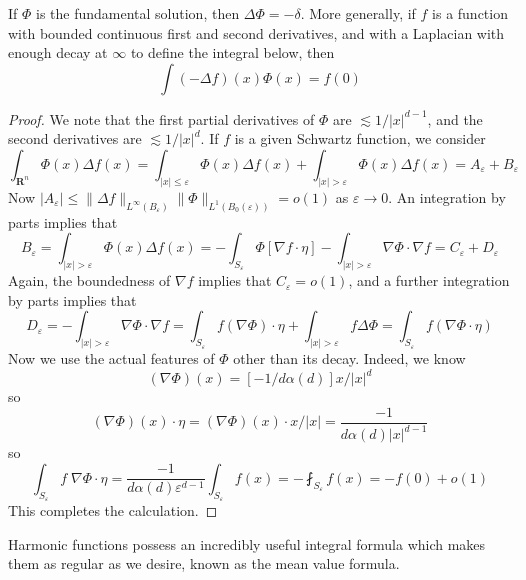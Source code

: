 \begin{theorem}
    If $\Phi$ is the fundamental solution, then $\Delta \Phi = - \delta$. More generally, if $f$ is a function with bounded continuous first and second derivatives, and with a Laplacian with enough decay at $\infty$ to define the integral below, then
    \[ \int (- \Delta f)(x) \Phi(x) = f(0) \]
\end{theorem}
\begin{proof}
    We note that the first partial derivatives of $\Phi$ are $\lesssim 1/|x|^{d-1}$, and the second derivatives are $\lesssim 1/|x|^d$. If $f$ is a given Schwartz function, we consider
    \[ \int_{\mathbf{R}^n} \Phi(x) \Delta f(x) = \int_{|x| \leq \varepsilon} \Phi(x) \Delta f(x) + \int_{|x| > \varepsilon} \Phi(x) \Delta f(x) = A_\varepsilon + B_\varepsilon \]
    Now $|A_\varepsilon| \leq \| \Delta f \|_{L^\infty(B_\varepsilon)} \| \Phi \|_{L^1(B_0(\varepsilon))} = o(1)$ as $\varepsilon \to 0$. An integration by parts implies that
    \[ B_\varepsilon = \int_{|x| > \varepsilon} \Phi(x) \Delta f(x) = - \int_{S_\varepsilon} \Phi [\nabla f \cdot \eta] - \int_{|x| > \varepsilon} \nabla \Phi \cdot \nabla f = C_\varepsilon + D_\varepsilon \]
    Again, the boundedness of $\nabla f$ implies that $C_\varepsilon = o(1)$, and a further integration by parts implies that
    \[ D_\varepsilon = - \int_{|x| > \varepsilon} \nabla \Phi \cdot \nabla f = \int_{S_\varepsilon} f (\nabla \Phi) \cdot \eta + \int_{|x| > \varepsilon} f \Delta \Phi = \int_{S_\varepsilon} f (\nabla \Phi \cdot \eta) \]
    Now we use the actual features of $\Phi$ other than its decay. Indeed, we know
    \[ (\nabla \Phi)(x) = [-1/d\alpha(d)] x/|x|^d \]
    so
    \[ (\nabla \Phi)(x) \cdot \eta = (\nabla \Phi)(x) \cdot x/|x| = \frac{-1}{d\alpha(d)|x|^{d-1}} \]
    so
    \[ \int_{S_\varepsilon} f\; \nabla \Phi \cdot \eta = \frac{-1}{d\alpha(d) \varepsilon^{d-1}} \int_{S_\varepsilon} f(x) = - \fint_{S_\varepsilon} f(x) = - f(0) + o(1) \]
    This completes the calculation.
\end{proof}

Harmonic functions possess an incredibly useful integral formula which makes them as regular as we desire, known as the mean value formula.

